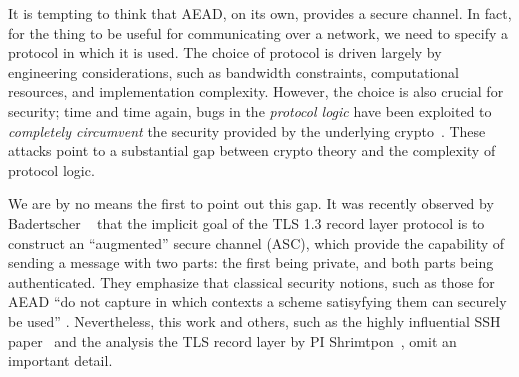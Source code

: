 It is tempting to think that AEAD, on its own, provides a secure
channel.  
 In
fact, for the thing to be useful for communicating over a network, we need to
specify a protocol in which it is used. The choice of protocol is driven largely
by engineering considerations, such as bandwidth constraints, computational
resources, and implementation complexity. However, the choice is also crucial
for security; time and time again, bugs in the \emph{protocol logic} have been
exploited to \emph{completely circumvent} the security provided by the
underlying crypto~\cite{BKN02}. These attacks point to a substantial gap between
crypto theory and the complexity of protocol logic.

We are by no means the first to point out this gap. It was recently observed by
Badertscher \etal~\cite{BMM+15} that the implicit goal of the TLS 1.3 record
layer protocol is to construct an ``augmented'' secure channel (ASC), which
provide the capability of sending a message with two parts: the first being
private, and both parts being authenticated. They emphasize that classical
security notions, such as those for AEAD ``do not capture in which contexts a
scheme satisyfying them can securely be used'' \cite[pp. 2]{BMM+15}.
Nevertheless, this work and others, such as the highly influential SSH
paper~\cite{BKN02} and the analysis the TLS record layer by PI
Shrimtpon~\cite{PRS11}, omit an important detail.

